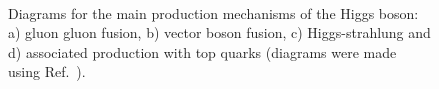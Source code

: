 \begin{figure}[htbp]
    \begin{center}
        \\
        \caption{Diagrams for the main production mechanisms of the Higgs boson: a) gluon gluon fusion, b) vector boson fusion, c) Higgs-strahlung and d) associated production with top quarks (diagrams were made using Ref.~\cite{fey_diag}).}
      \label{fig:higgs_prod_diag}
    \end{center}
  \end{figure}

